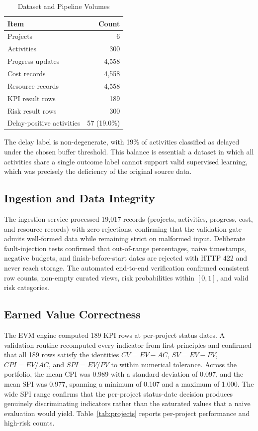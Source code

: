 \documentclass[conference]{IEEEtran}
\begin{document}
\begin{table}[t]
\caption{Dataset and Pipeline Volumes}
\label{tab:dataset}
\centering
\footnotesize
\begin{tabular}{@{}lr@{}}
\toprule
\textbf{Item} & \textbf{Count} \\
\midrule
Projects & 6 \\
Activities & 300 \\
Progress updates & 4,558 \\
Cost records & 4,558 \\
Resource records & 4,558 \\
KPI result rows & 189 \\
Risk result rows & 300 \\
Delay-positive activities & 57 (19.0\%) \\
\bottomrule
\end{tabular}
\end{table}

The delay label is non-degenerate, with 19\% of activities classified as delayed under the chosen buffer threshold. This balance is essential: a dataset in which all activities share a single outcome label cannot support valid supervised learning, which was precisely the deficiency of the original source data.

\subsection{Ingestion and Data Integrity}

The ingestion service processed 19,017 records (projects, activities, progress, cost, and resource records) with zero rejections, confirming that the validation gate admits well-formed data while remaining strict on malformed input. Deliberate fault-injection tests confirmed that out-of-range percentages, naive timestamps, negative budgets, and finish-before-start dates are rejected with HTTP 422 and never reach storage. The automated end-to-end verification confirmed consistent row counts, non-empty curated views, risk probabilities within \([0,1]\), and valid risk categories.

\subsection{Earned Value Correctness}

The EVM engine computed 189 KPI rows at per-project status dates. A validation routine recomputed every indicator from first principles and confirmed that all 189 rows satisfy the identities \(CV = EV - AC\), \(SV = EV - PV\), \(CPI = EV/AC\), and \(SPI = EV/PV\) to within numerical tolerance. Across the portfolio, the mean CPI was 0.989 with a standard deviation of 0.097, and the mean SPI was 0.977, spanning a minimum of 0.107 and a maximum of 1.000. The wide SPI range confirms that the per-project status-date decision produces genuinely discriminating indicators rather than the saturated values that a naive evaluation would yield. Table~\ref{tab:projects} reports per-project performance and high-risk counts.
\end{document}
